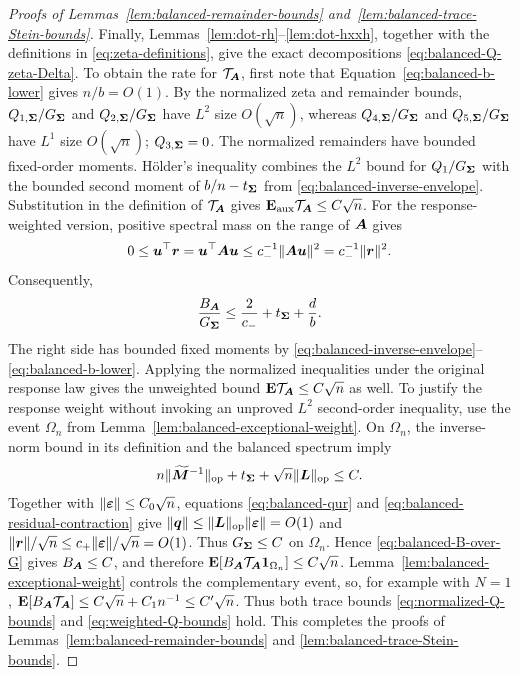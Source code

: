 \documentclass{article}
\theoremstyle{plain} %
\theoremstyle{definition} %
\theoremstyle{definition} %
\begin{document}
\begin{proof}[Proofs of Lemmas~\ref{lem:balanced-remainder-bounds}
and~\ref{lem:balanced-trace-Stein-bounds}]
Finally, Lemmas~\ref{lem:dot-rh}--\ref{lem:dot-hxxh}, together with
the definitions in \eqref{eq:zeta-definitions}, give
the exact decompositions \eqref{eq:balanced-Q-zeta-Delta}.
To obtain the rate for $\mathcal T_{\boldsymbol{A}}$, first note that
Equation~\eqref{eq:balanced-b-lower} gives $n/b=O(1)$.
By the normalized zeta and remainder bounds,
$Q_{1,\boldsymbol{\Sigma}}/G_{\boldsymbol{\Sigma}}$ and
$Q_{2,\boldsymbol{\Sigma}}/G_{\boldsymbol{\Sigma}}$ have $L^2$ size $O(\sqrt n)$,
whereas $Q_{4,\boldsymbol{\Sigma}}/G_{\boldsymbol{\Sigma}}$ and
$Q_{5,\boldsymbol{\Sigma}}/G_{\boldsymbol{\Sigma}}$ have $L^1$ size $O(\sqrt n)$;
$Q_{3,\boldsymbol{\Sigma}}=0$.  The normalized remainders have bounded
fixed-order moments. H\"older's inequality combines the $L^2$
bound for $Q_1/G_{\boldsymbol{\Sigma}}$ with the bounded second moment of
$b/n-t_{\boldsymbol{\Sigma}}$ from \eqref{eq:balanced-inverse-envelope}.
Substitution in the definition of $\mathcal T_{\boldsymbol{A}}$ gives
${\mathbf{E}}_{\rm aux}\mathcal T_{\boldsymbol{A}}\leq C\sqrt n$.
For the response-weighted version, positive spectral mass on the range of
$\boldsymbol{A}$ gives
\begin{align*}
    0\leq\boldsymbol{u}^\top\boldsymbol{r}=\boldsymbol{u}^\top\boldsymbol{A}\boldsymbol{u}
    \leq c_-^{-1}\lVert\boldsymbol{A}\boldsymbol{u}\rVert^2
    =c_-^{-1}\lVert\boldsymbol{r}\rVert^2.
\end{align*}
Consequently,
\begin{align}
    \frac{B_{\boldsymbol{A}}}{G_{\boldsymbol{\Sigma}}}
    \leq \frac{2}{c_-}+t_{\boldsymbol{\Sigma}}+\frac{d}{b}.
    \label{eq:balanced-B-over-G}
\end{align}
The right side has bounded fixed moments by
\eqref{eq:balanced-inverse-envelope}--\eqref{eq:balanced-b-lower}.  Applying
the normalized inequalities under the original response law gives the
unweighted bound ${\mathbf{E}}\mathcal T_{\boldsymbol{A}}\leq C\sqrt n$ as well.  To justify the
response weight without invoking an unproved $L^2$ second-order inequality,
use the event $\Omega_n$ from
Lemma~\ref{lem:balanced-exceptional-weight}.  On $\Omega_n$, the inverse-norm bound in its definition and the
balanced spectrum imply
\begin{align*}
    n\lVert\widetilde{\boldsymbol{M}}^{-1}\rVert_{\rm op}
       +t_{\boldsymbol{\Sigma}}+\sqrt n\lVert\boldsymbol{L}\rVert_{\rm op}\leq C.
\end{align*}
Together with $\lVert{\boldsymbol{\varepsilon} }\rVert\leq C_0\sqrt n$, equations
\eqref{eq:balanced-qur} and \eqref{eq:balanced-residual-contraction} give
$\lVert\boldsymbol{q}\rVert\leq\lVert\boldsymbol{L}\rVert_{\rm op}\lVert{\boldsymbol{\varepsilon} }\rVert=O(1)$ and
$\lVert\boldsymbol{r}\rVert/\sqrt n\leq c_+\lVert{\boldsymbol{\varepsilon} }\rVert/\sqrt n=O(1)$.
Thus $G_{\boldsymbol{\Sigma}}\leq C$ on $\Omega_n$.
Hence \eqref{eq:balanced-B-over-G} gives
$B_{\boldsymbol{A}}\leq C$, and therefore
${\mathbf{E}}[B_{\boldsymbol{A}}\mathcal T_{\boldsymbol{A}}\boldsymbol{1}_{\Omega_n}]\leq C\sqrt n$.
Lemma~\ref{lem:balanced-exceptional-weight} controls the complementary event,
so, for example with $N=1$,
${\mathbf{E}}[B_{\boldsymbol{A}}\mathcal T_{\boldsymbol{A}}]
\leq C\sqrt n+C_1n^{-1}\leq C'\sqrt n$.
Thus both trace bounds \eqref{eq:normalized-Q-bounds} and
\eqref{eq:weighted-Q-bounds} hold.
This completes the proofs of Lemmas~\ref{lem:balanced-remainder-bounds} and
\ref{lem:balanced-trace-Stein-bounds}.
\end{proof}
\end{document}
